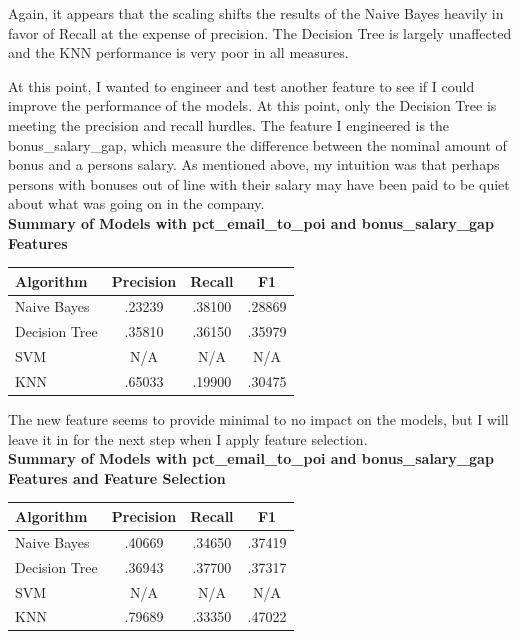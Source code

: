 \documentclass[a4paper,11pt]{report}
\begin{document}
Again, it appears that the scaling shifts the results of the Naive Bayes heavily
in favor of Recall at the expense of precision.  The Decision Tree is largely
unaffected and the KNN performance is very poor in all measures.

At this point, I wanted to engineer and test another feature to see if I could
improve the performance of the models.  At this point, only the Decision Tree is
meeting the precision and recall hurdles.  The feature I engineered is the
bonus\_salary\_gap, which measure the difference between the nominal amount of
bonus and a persons salary.  As mentioned above, my intuition was that perhaps
persons with bonuses out of line with their salary may have been paid to be
quiet about what was going on in the company. \\

\textbf{Summary of Models with pct\_email\_to\_poi and bonus\_salary\_gap
Features} \\
\begin{center}
    \begin{tabular}{|| l c c c ||}
        \hline Algorithm & Precision & Recall & F1 \\
        \hline\hline
        Naive Bayes & .23239 & .38100 & .28869 \\
        \hline
        Decision Tree & .35810 & .36150 & .35979 \\
        \hline
        SVM & N/A & N/A & N/A \\
        \hline
        KNN & .65033 & .19900 & .30475  \\
        \hline
    \end{tabular}
\end{center}

The new feature seems to provide minimal to no impact on the models, but I will
leave it in for the next step when I apply feature selection. \\

\textbf{Summary of Models with pct\_email\_to\_poi and bonus\_salary\_gap Features
and Feature Selection} \\
\begin{center}
    \begin{tabular}{|| l c c c ||}
        \hline Algorithm & Precision & Recall & F1 \\
        \hline\hline
        Naive Bayes & .40669 & .34650 & .37419 \\
        \hline
        Decision Tree & .36943 & .37700 & .37317 \\
        \hline
        SVM & N/A & N/A & N/A \\
        \hline
        KNN & .79689 & .33350 & .47022  \\
        \hline
    \end{tabular}
\end{center}
\end{document}
